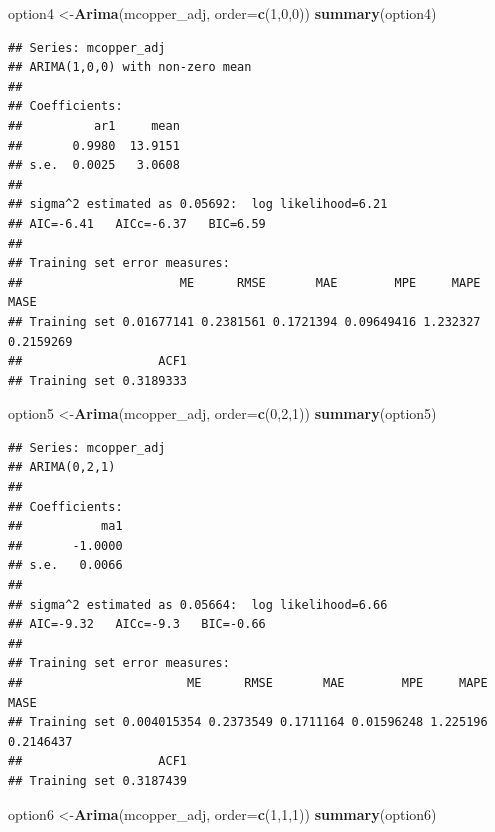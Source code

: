 \documentclass[]{book}
\newenvironment{Shaded}{\begin{snugshade}}{\end{snugshade}}
\newcommand{\DataTypeTok}[1]{\textcolor[rgb]{0.13,0.29,0.53}{#1}}
\newcommand{\DecValTok}[1]{\textcolor[rgb]{0.00,0.00,0.81}{#1}}
\newcommand{\KeywordTok}[1]{\textcolor[rgb]{0.13,0.29,0.53}{\textbf{#1}}}
\newcommand{\NormalTok}[1]{#1}
\begin{document}
\begin{Shaded}
\begin{Highlighting}[]
\NormalTok{option4 <-}\KeywordTok{Arima}\NormalTok{(mcopper_adj, }\DataTypeTok{order=}\KeywordTok{c}\NormalTok{(}\DecValTok{1}\NormalTok{,}\DecValTok{0}\NormalTok{,}\DecValTok{0}\NormalTok{))}
\KeywordTok{summary}\NormalTok{(option4)}
\end{Highlighting}
\end{Shaded}

\begin{verbatim}
## Series: mcopper_adj 
## ARIMA(1,0,0) with non-zero mean 
## 
## Coefficients:
##          ar1     mean
##       0.9980  13.9151
## s.e.  0.0025   3.0608
## 
## sigma^2 estimated as 0.05692:  log likelihood=6.21
## AIC=-6.41   AICc=-6.37   BIC=6.59
## 
## Training set error measures:
##                      ME      RMSE       MAE        MPE     MAPE      MASE
## Training set 0.01677141 0.2381561 0.1721394 0.09649416 1.232327 0.2159269
##                   ACF1
## Training set 0.3189333
\end{verbatim}

\begin{Shaded}
\begin{Highlighting}[]
\NormalTok{option5 <-}\KeywordTok{Arima}\NormalTok{(mcopper_adj, }\DataTypeTok{order=}\KeywordTok{c}\NormalTok{(}\DecValTok{0}\NormalTok{,}\DecValTok{2}\NormalTok{,}\DecValTok{1}\NormalTok{))}
\KeywordTok{summary}\NormalTok{(option5)}
\end{Highlighting}
\end{Shaded}

\begin{verbatim}
## Series: mcopper_adj 
## ARIMA(0,2,1) 
## 
## Coefficients:
##           ma1
##       -1.0000
## s.e.   0.0066
## 
## sigma^2 estimated as 0.05664:  log likelihood=6.66
## AIC=-9.32   AICc=-9.3   BIC=-0.66
## 
## Training set error measures:
##                       ME      RMSE       MAE        MPE     MAPE      MASE
## Training set 0.004015354 0.2373549 0.1711164 0.01596248 1.225196 0.2146437
##                   ACF1
## Training set 0.3187439
\end{verbatim}

\begin{Shaded}
\begin{Highlighting}[]
\NormalTok{option6 <-}\KeywordTok{Arima}\NormalTok{(mcopper_adj, }\DataTypeTok{order=}\KeywordTok{c}\NormalTok{(}\DecValTok{1}\NormalTok{,}\DecValTok{1}\NormalTok{,}\DecValTok{1}\NormalTok{))}
\KeywordTok{summary}\NormalTok{(option6)}
\end{Highlighting}
\end{Shaded}
\end{document}
